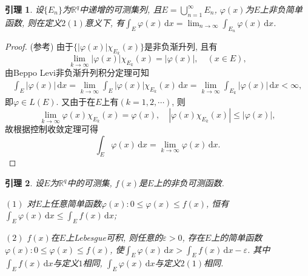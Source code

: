 \documentclass[12pt, a4paper, oneside]{ctexart}
\newtheorem{lemma}{引理}
\numberwithin{equation}{section}  %
\let\leq=\leqslant %
\def\R{\mathbb{R}}          %
\def\d{\mathrm{d}}          %
\def\add{\vspace{1ex}}      %
\begin{document}
\begin{lemma}
    设$\{E_n\}$为$\R^q$中递增的可测集列, 且$E=\bigcup_{n=1}^\infty E_n$, $\varphi(x)$为$E$上非负简单函数, 则在定义$2(1)$意义下, 有$\int_E\varphi(x)\,\d x =\lim_{n\to\infty}\int_{E_n}\varphi(x)\,\d x$.
\end{lemma}
\begin{proof}(参考\cite{zmq})
    由于$\{|\varphi(x)|\chi_{E_k}(x)\}$是非负渐升列, 且有
    \begin{equation*}
        \lim_{k\to\infty}|\varphi(x)|\chi_{E_k}(x)=|\varphi(x)|,\quad (x\in E),
    \end{equation*}
    由Beppo Levi非负渐升列积分定理可知
    \begin{align*}
        \int_E|\varphi(x)|\,\d x=\lim_{k\to\infty}\int_{E}|\varphi(x)|\chi_{E_k}(x)\,\d x = \lim_{k\to\infty}\int_{E_k}|\varphi(x)|\,\d x < \infty,
    \end{align*}
    即$\varphi\in L(E)$. 又由于在$E$上有$(k=1,2,\cdots)$, 则
    \begin{equation*}
        \lim_{k\to\infty}\varphi(x)\chi_{E_k}(x)=\varphi(x),\quad |\varphi(x)\chi_{E_k}(x)|\leq |\varphi(x)|,
    \end{equation*}
    故根据控制收敛定理可得
    \begin{equation*}
        \int_E\varphi(x)\,\d x=\lim_{k\to\infty}\varphi(x)\,\d x.
    \end{equation*}
\end{proof}
\begin{lemma}
    设$E$为$\R^q$中的可测集, $f(x)$是$E$上的非负可测函数.

    $(1)$ 对$E$上任意简单函数$\varphi(x):0\leq \varphi(x)\leq f(x)$, 恒有$\int_{E}\varphi(x)\,\d x\leq \int_{E}f(x)\,\d x$;\add

    $(2)$ $f(x)$在$E$上Lebesgue可积, 则任意的$\varepsilon > 0$, 存在$E$上的简单函数$\varphi(x):0\leq \varphi(x)\leq f(x)$, 使$\int_E\varphi(x)\,\d x>\int_Ef(x)\,\d x-\varepsilon$. 其中$\int_Ef(x)\,\d x$与定义$1$相同, $\int_E\varphi(x)\,\d x$与定义$2(1)$相同.
\end{lemma}
\end{document}
